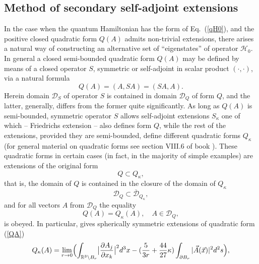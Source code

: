 \documentclass[12pt]{article}
\newcommand{\ol}{\overline}
\newcommand{\DD}{\mathcal{D}}
\newcommand{\HH}{\mathscr{H}}
\newcommand{\RR}{\mathbb{R}}
\begin{document}
\subsection{Method of secondary self-adjoint extensions}
	In the case when the quantum Hamiltonian has the form of 
Eq.~(\ref{qH0}),
	and the positive closed quadratic form
$ Q(A) $
	admits non-trivial extensions,
	there arises a natural way of constructing an alternative
    set of ``eigenstates'' of operator
$ \HH_{0} $.
    In general a closed semi-bounded quadratic form
$ Q(A) $
    may be defined by means of a closed operator
$ S $,
    symmetric or self-adjoint
    in scalar product
$ (\cdot , \cdot ) $,
	via a natural formula
\begin{equation*}
    Q(A) = (A,SA) = (SA,A).
\end{equation*}
	Herein domain
$ \DD_{S} $
	of operator
$ S $
	is contained in domain
$ \DD_{Q} $
	of form
$ Q $,
	and the latter, generally, differs from the former quite significantly.
    As long as
$ Q(A) $ 
    is semi-bounded, symmetric operator
$ S $
    allows self-adjoint extensions
$ S_{\kappa} $
	one of which -- Friedrichs extension
\cite{FStone} --
	also defines form
$ Q $,
	while the rest of the extensions, provided they are semi-bounded,
	define different quadratic forms
$ Q_{\kappa} $
(for general material on quadratic forms see section VIII.6 of book
\cite{RS1}).
	These quadratic forms in certain cases (in fact, in the majority of simple examples)
	are extensions of the original form
\begin{equation*}
    Q \subset Q_{\kappa} ,
\end{equation*}
	that is, the domain of 
$ Q $
	is contained in the closure of the domain of 
$ Q_{\kappa} $
\begin{equation*}
    \DD_{Q} \subset \ol{\DD}_{Q_{\kappa}} ,
\end{equation*}
	and for all vectors
$ A $ from
$ \DD_{Q} $
	the equality
\begin{equation*}
    Q(A) = Q_{\kappa}(A) ,\quad A\in \DD_{Q} ,
\end{equation*}
	is obeyed.
	In particular, 
\cite{Inv}
	gives spherically symmetric extensions of quadratic form
(\ref{QA})
\begin{equation}
\label{QkA}
        Q_{\kappa}(A) = \lim_{r\to 0}\Bigl(
    \int_{\RR^{3}\setminus B_{r}}
        \bigl|\frac{\partial A_{j}}{\partial x_{k}}\bigr|^{2} d^{3} x -
    (\frac{5}{3r}+ \frac{44}{27}\kappa) \int_{\partial B_{r}}
        |\vec{A}(\vec{x})|^{2} d^{2} s \Bigr) ,
\end{equation}
\end{document}
